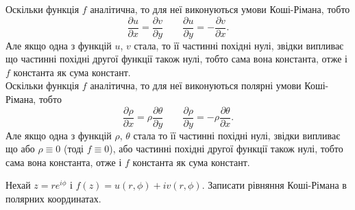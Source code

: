 \begin{solution}
    Оскільки функція $f$ аналітична, то для неї виконуються умови Коші-Рімана, тобто 
    \[ \dfrac{\partial u}{\partial x} = \dfrac{\partial v}{\partial y} \qquad \dfrac{\partial u}{\partial y} = - \dfrac{\partial v}{\partial x}. \]
    Але якщо одна з функцій $u$, $v$ стала, то її частинні похідні нулі, звідки випливає що частинні похідні другої функції також нулі, тобто сама вона константа, отже і $f$ константа як сума констант. \\

    Оскільки функція $f$ аналітична, то для неї виконуються полярні умови Коші-Рімана, тобто 
    \[ \dfrac{\partial \rho}{\partial x} = \rho \dfrac{\partial \theta}{\partial y} \qquad \dfrac{\partial \rho}{\partial y} = - \rho \dfrac{\partial \theta}{\partial x}. \]
    Але якщо одна з функцій $\rho$, $\theta$ стала то її частинні похідні нулі, звідки випливає що або $\rho \equiv 0$ (тоді $f \equiv 0$), або частинні похідні другої функції також нулі, тобто сама вона константа, отже і $f$ константа як сума констант. \\    
\end{solution}

\begin{problem}[Волковиський, 135]
    Нехай $z = r e^{i \phi}$ і $f(z) = u(r, \phi) + i v(r, \phi)$. Записати рівняння Коші-Рімана в полярних координатах.
\end{problem}

